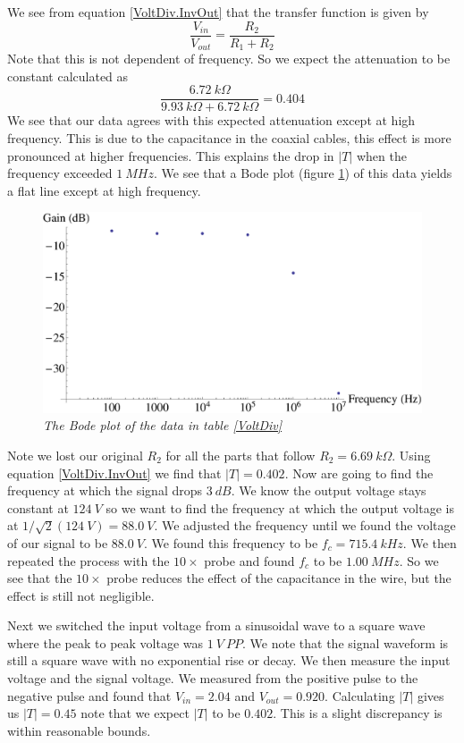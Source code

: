 \documentclass[11pt]{article}
\numberwithin{equation}{section}
\numberwithin{figure}{section}
\numberwithin{table}{section}
\begin{document}
We see from equation \ref{VoltDiv.InvOut} that the transfer function is given by
$$\frac{V_{in}}{V_{out}} = \frac{R_2}{R_1+R_2}$$
Note that this is not dependent of frequency. So we expect the attenuation to be constant calculated as
$$\frac{6.72\ k\Omega}{9.93\ k\Omega+6.72\ k\Omega} = 0.404$$
We see that our data agrees with this expected attenuation except at high frequency. This is due to the capacitance in the coaxial cables, this effect is more pronounced at higher frequencies. This explains the drop in $|T|$ when the frequency exceeded $1\ MHz$. We see that a Bode plot (figure \ref{BodeVoltDivData}) of this data yields a flat line except at high frequency. 
\begin{figure}[h]
\centering
\includegraphics[scale=0.60]{BodeVoltDivData.eps}
\caption{\textit{The Bode plot of the data in table \ref{VoltDiv}}}
\label{BodeVoltDivData}
\end{figure}

Note we lost our original $R_2$ for all the parts that follow $R_2 = 6.69\ k\Omega$. Using equation \ref{VoltDiv.InvOut} we find that $|T| = 0.402$. Now are going to find the frequency at which the signal drops $3\ dB$. We know the output voltage stays constant at $124\ V$ so we want to find the frequency at which the output voltage is at $1/\sqrt{2}(124\ V) = 88.0\ V$. We adjusted the frequency until we found the voltage of our signal to be $88.0\ V$. We found this frequency to be $f_c = 715.4\ kHz$. We then repeated the process with the $10\times$ probe and found $f_c$ to be $1.00\ MHz$. So we see that the $10\times$ probe reduces the effect of the capacitance in the wire, but the effect is still not negligible.

Next we switched the input voltage from a sinusoidal wave to a square wave where the peak to peak voltage was $1\ V\ PP$. We note that the signal waveform is still a square wave with no exponential rise or decay. We then measure the input voltage and the signal voltage. We measured from the positive pulse to the negative pulse and found that $V_{in} = 2.04$ and $V_{out} = 0.920$. Calculating $|T|$ gives us $|T| = 0.45$ note that we expect $|T|$ to be $0.402$. This is a slight discrepancy is within reasonable bounds. 
\end{document}
